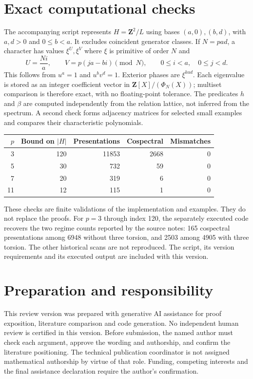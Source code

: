 \documentclass[11pt]{article}
\theoremstyle{remark}\newtheorem{remark}[theorem]{Remark}
\newcommand{\Z}{\mathbf Z}
\begin{document}
\section{Exact computational checks}
The accompanying script represents $H=\Z^2/L$ using bases $(a,0),(b,d)$, with $a,d>0$ and $0\leq b<a$. It excludes coincident generator classes. If $N=pad$, a character has values $\xi^U,\xi^V$ where $\xi$ is primitive of order $N$ and
\[
U=\frac{N i}{a},\qquad
V=p(ja-bi)\pmod N,\qquad 0\leq i<a,\quad 0\leq j<d.
\]
This follows from $u^a=1$ and $u^bv^d=1$. Exterior phases are $\xi^{k ad}$. Each eigenvalue is stored as an integer coefficient vector in $\Z[X]/(\Phi_N(X))$; multiset comparison is therefore exact, with no floating-point tolerance. The predicates $h$ and $\beta$ are computed independently from the relation lattice, not inferred from the spectrum. A second check forms adjacency matrices for selected small examples and compares their characteristic polynomials.

\begin{center}
\begin{tabular}{rrrrr}
\toprule
$p$ & Bound on $|H|$ & Presentations & Cospectral & Mismatches\\
\midrule
3 & 120 & 11853 & 2668 & 0\\
5 & 30 & 732 & 59 & 0\\
7 & 20 & 319 & 6 & 0\\
11 & 12 & 115 & 1 & 0\\
\bottomrule
\end{tabular}
\end{center}

These checks are finite validations of the implementation and examples. They do not replace the proofs. For $p=3$ through index 120, the separately executed code recovers the two regime counts reported by the source notes: 165 cospectral presentations among 6948 without three torsion, and 2503 among 4905 with three torsion. The other historical scans are not reproduced. The script, its version requirements and its executed output are included with this version.

\section*{Preparation and responsibility}
This review version was prepared with generative AI assistance for proof exposition, literature comparison and code generation. No independent human review is certified in this version. Before submission, the named author must check each argument, approve the wording and authorship, and confirm the literature positioning. The technical publication coordinator is not assigned mathematical authorship by virtue of that role. Funding, competing interests and the final assistance declaration require the author's confirmation.
\end{document}
